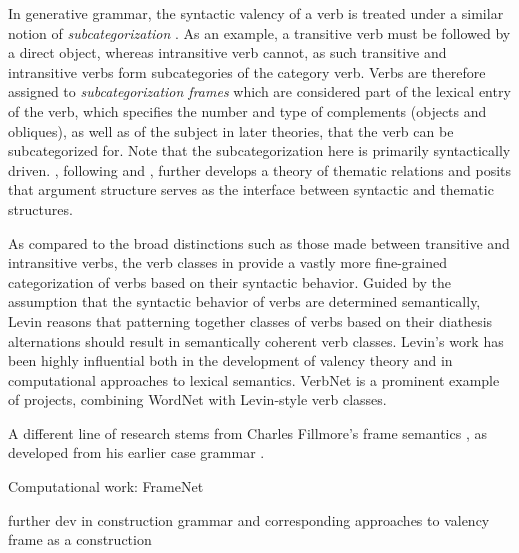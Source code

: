 In generative grammar, the syntactic valency of a verb is treated under a similar notion of \textit{subcategorization} \citep{chomsky1965a}. As an example, a transitive verb must be followed by a direct object, whereas intransitive verb cannot, as such transitive and intransitive verbs form subcategories of the category verb. Verbs are therefore assigned to \textit{subcategorization frames} which are considered part of the lexical entry of the verb, which specifies the number and type of complements (objects and obliques), as well as of the subject in later theories, that the verb can be subcategorized for. Note that the subcategorization here is primarily syntactically driven. \citet{jackendoff1972,jackendoff1987,jackendoff1992}, following \citet{katz1963} and \citet{gruber1962}, further develops a theory of thematic relations and posits that argument structure serves as the interface between syntactic and thematic structures.


As compared to the broad distinctions such as those made between transitive and intransitive verbs, the verb classes in \citet{levin1993} provide a vastly more fine-grained categorization of verbs based on their syntactic behavior. Guided by the assumption that the syntactic behavior of verbs are determined semantically, Levin reasons that patterning together classes of verbs based on their diathesis alternations should result in semantically coherent verb classes. Levin's work has been highly influential both in the development of valency theory and in computational approaches to lexical semantics. VerbNet \cite{kipper-schuler2005, kipper2006, kipper2008} is a prominent example of projects, combining WordNet \cite{fellbaum1998, miller1995} with Levin-style verb classes. 

A different line of research stems from Charles Fillmore's frame semantics \citep{fillmore1977, fillmore1977a, fillmore1982},
as developed from his earlier
case grammar \citep{fillmore1968,fillmore1970}.

Computational work: FrameNet \citep{fillmore2015}

further dev in construction grammar and corresponding approaches to valency frame as a construction \citet{goldberg1992,goldberg1995}

